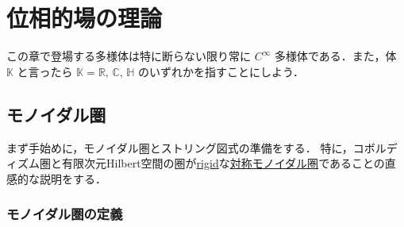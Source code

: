 \documentclass[TQFT_main]{subfiles}
\begin{document}
\setcounter{chapter}{2}

\chapter{位相的場の理論}

この章で登場する多様体は特に断らない限り常に $C^\infty$ 多様体である．また，体 $\mathbb{K}$ と言ったら $\mathbb{K} = \mathbb{R},\, \mathbb{C},\, \mathbb{H}$ のいずれかを指すことにしよう．

\section{モノイダル圏}

まず手始めに，モノイダル圏とストリング図式の準備をする．
特に，コボルディズム圏と有限次元Hilbert空間の圏が\hyperref[def:compact]{rigid}な\hyperref[def:braided-monoidal]{対称モノイダル圏}であることの直感的な説明をする．

\subsection{モノイダル圏の定義}
\end{document}
